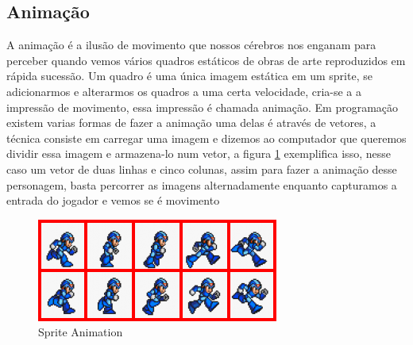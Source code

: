 \subsection{Animação}
 A animação é a ilusão de movimento que nossos cérebros nos enganam para perceber quando vemos vários quadros estáticos de obras de arte reproduzidos em rápida sucessão.
Um quadro é uma única imagem estática em um sprite, se adicionarmos e alterarmos os quadros a uma certa velocidade, cria-se a a impressão de movimento, essa impressão é chamada animação. 
Em programação existem varias formas de fazer a animação uma delas é através de vetores, a técnica consiste em carregar uma imagem e dizemos ao computador que queremos dividir essa imagem e armazena-lo num vetor, a figura \ref{fig:sprite-animation} exemplifica isso, nesse caso um vetor de duas linhas e cinco colunas, assim para fazer a animação desse personagem, basta percorrer as imagens alternadamente enquanto capturamos a entrada do jogador e vemos se é movimento

\begin{figure}[h!]
    \centering
    \includegraphics[width=0.8\linewidth]{figuras/megaman-sprite-animation-export.png}
    \caption{Sprite Animation}
    \label{fig:sprite-animation}
\end{figure}






